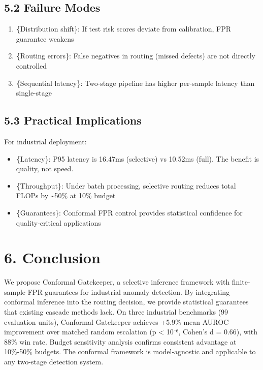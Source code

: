 \documentclass[10pt]{article}
\begin{document}
\subsection{5.2 Failure Modes}

\begin{enumerate}
\item \textbf\{Distribution shift\}: If test risk scores deviate from calibration, FPR guarantee weakens
\item \textbf\{Routing errors\}: False negatives in routing (missed defects) are not directly controlled
\item \textbf\{Sequential latency\}: Two-stage pipeline has higher per-sample latency than single-stage
\end{enumerate}

\subsection{5.3 Practical Implications}

For industrial deployment:
\begin{itemize}
\item \textbf\{Latency\}: P95 latency is 16.47ms (selective) vs 10.52ms (full). The benefit is quality, not speed.
\item \textbf\{Throughput\}: Under batch processing, selective routing reduces total FLOPs by \textasciitilde{}50\% at 10\% budget
\item \textbf\{Guarantees\}: Conformal FPR control provides statistical confidence for quality-critical applications
\end{itemize}

\section{6. Conclusion}

We propose Conformal Gatekeeper, a selective inference framework with finite-sample FPR guarantees for industrial anomaly detection. By integrating conformal inference into the routing decision, we provide statistical guarantees that existing cascade methods lack. On three industrial benchmarks (99 evaluation units), Conformal Gatekeeper achieves +5.9\% mean AUROC improvement over matched random escalation (p < 10⁻⁶, Cohen's d = 0.66), with 88\% win rate. Budget sensitivity analysis confirms consistent advantage at 10\%-50\% budgets. The conformal framework is model-agnostic and applicable to any two-stage detection system.
\end{document}
